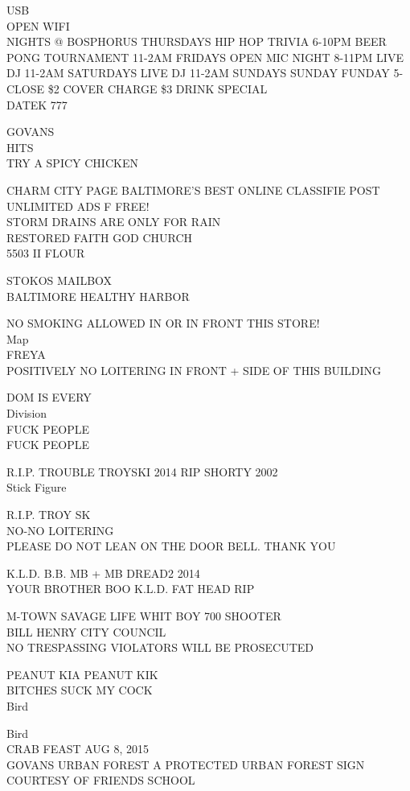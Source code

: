\documentclass[10pt,letterpaper]{article}
\begin{document}
USB\\
OPEN WIFI\\
NIGHTS @ BOSPHORUS THURSDAYS HIP HOP TRIVIA 6{-}10PM BEER PONG TOURNAMENT 11{-}2AM FRIDAYS OPEN MIC NIGHT 8{-}11PM LIVE DJ 11{-}2AM SATURDAYS LIVE DJ 11{-}2AM SUNDAYS SUNDAY FUNDAY 5{-}CLOSE \$2 COVER CHARGE \$3 DRINK SPECIAL\\
DATEK 777

GOVANS\\
HITS\\
TRY A SPICY CHICKEN

CHARM CITY PAGE BALTIMORE'S BEST ONLINE CLASSIFIE POST UNLIMITED ADS F FREE!\\
STORM DRAINS ARE ONLY FOR RAIN\\
RESTORED FAITH GOD CHURCH\\
5503 II FLOUR

STOKOS MAILBOX\\
BALTIMORE HEALTHY HARBOR

NO SMOKING ALLOWED IN OR IN FRONT THIS STORE!\\
Map\\
FREYA\\
POSITIVELY NO LOITERING IN FRONT + SIDE OF THIS BUILDING

DOM IS EVERY\\
Division\\
FUCK PEOPLE\\
FUCK PEOPLE

R.I.P. TROUBLE TROYSKI 2014 RIP SHORTY 2002\\
Stick Figure

R.I.P. TROY SK\\
NO{-}NO LOITERING\\
PLEASE DO NOT LEAN ON THE DOOR BELL.  THANK YOU

K.L.D. B.B. MB + MB DREAD2 2014\\
YOUR BROTHER BOO K.L.D. FAT HEAD RIP

M{-}TOWN SAVAGE LIFE WHIT BOY 700 SHOOTER\\
BILL HENRY CITY COUNCIL\\
NO TRESPASSING VIOLATORS WILL BE PROSECUTED

PEANUT KIA PEANUT KIK\\
BITCHES SUCK MY COCK\\
Bird

Bird\\
CRAB FEAST AUG 8, 2015\\
GOVANS URBAN FOREST A PROTECTED URBAN FOREST SIGN COURTESY OF FRIENDS SCHOOL
\end{document}
